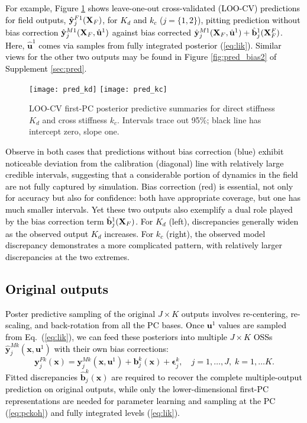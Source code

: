 \documentclass[12pt]{article}
\newcommand{\blu}[1]{\textcolor{black}{#1}} %
\newcommand{\blunew}[1]{\textcolor{black}{#1}} %
\begin{document}
 \blu{
For example, Figure \ref{fig:pred_bias} shows 
leave-one-out cross-validated (LOO-CV) predictions for field outputs,
  $\hat{\mathbf{y}}^{F1}_j( \mathbf{X}_{\blunew{F}})$, for $K_d$ and $k_c$ ($j=\{1,2\}$), 
 pitting  prediction without bias correction  
$\hat{\mathbf{y}}^{M1}_j( \mathbf{X}_{\blunew{F}}, \hat{\mathbf{u}}^1 )$ against
bias corrected
$\hat{\mathbf{y}}^{M1}_j( \mathbf{X}_{\blunew{F}}, \hat{\mathbf{u}}^1 ) 
+ \hat{\mathbf{b}}^1_j(\mathbf{X}^F_{\blunew{F}})$. 
Here, $\hat{\mathbf{u}}^1$ comes via samples from fully integrated posterior (\ref{eq:lik}). 
Similar views for the other two outputs may be found in Figure \ref{fig:pred_bias2} of Supplement \ref{sec:pred}. 
}
\begin{figure}[ht!]
\centering
\texttt{[image: pred\_kd]}
\texttt{[image: pred\_kc]}
\caption{LOO-CV first-PC posterior predictive summaries 
for direct stiffness $K_d$ and cross stiffness $k_c$.  
Intervals trace out 95\%; black line has intercept zero, slope one.}
\label{fig:pred_bias}
\end{figure}
\blu{
Observe in both cases that predictions without bias correction (blue) 
exhibit noticeable deviation from the calibration (diagonal) line
with relatively large credible intervals, suggesting that a considerable portion of dynamics
in the field are not fully captured by simulation.
Bias correction (red) is essential, not only for accuracy but also for confidence:
both have appropriate coverage, but one has much smaller intervals.
Yet these two outputs also exemplify a dual role played by the 
bias correction term $\hat{\mathbf{b}}^1_j(\mathbf{X}_{\blunew{F}})$.
For $K_d$ (left), discrepancies generally widen as the observed output $K_d$ increases.
 For $k_c$ (right), the observed model discrepancy
 demonstrates a more complicated pattern, with relatively larger
 discrepancies at the two extremes.  
 }

\blu{
\subsection{Original outputs}
\label{sec:orpred}
}
 \blu{
Poster predictive sampling of the original $J \times K$ outputs involves
re-centering, re-scaling, and back-rotation from all the PC bases. Once 
$\mathbf{u}^1$ values are sampled from Eq.~(\ref{eq:lik}), we can feed these posteriors into multiple $J \times K$
OSSs  $\hat{\mathbf{y}}_j^{Mk}
 (\mathbf{x}, \mathbf{u}^{1})$  with their own bias corrections:
\begin{equation}
\mathbf{y}_j^{Fk}(\mathbf{x}) = \mathbf{y}_j^{Mk} (\mathbf{x}, \mathbf{u}^{1})
 + \mathbf{b}^k_j(\mathbf{x})  + \mathbf{\epsilon}^k_j,
 \quad j = 1, \dots, J, \; k = 1, \dots K.  
  \label{eq:pckoh2}
\end{equation}
Fitted discrepancies
 $\hat{\mathbf{b}}^k_j(\mathbf{x}) $ are required to recover the complete
 multiple-output prediction on original outputs, while only the
 lower-dimensional first-PC representations are needed for parameter learning
 and sampling at the PC (\ref{eq:pckoh}) and fully
 integrated levels (\ref{eq:lik}). }
\end{document}
